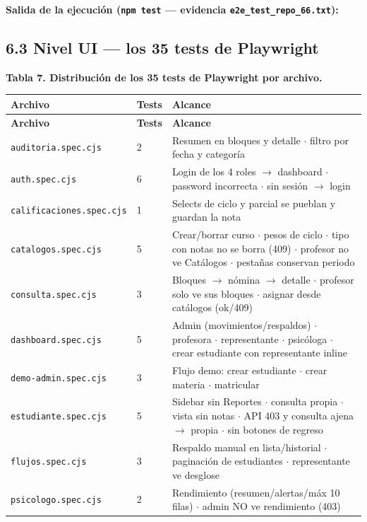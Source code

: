 \documentclass[11pt,a4paper]{article}
\begin{document}
\textbf{Salida de la ejecución (\texttt{npm test} --- evidencia \texttt{e2e\_test\_repo\_66.txt}):}


\subsection*{6.3 Nivel UI --- los 35 tests de Playwright}


\textbf{Tabla 7. Distribución de los 35 tests de Playwright por archivo.}


{\small
\begin{longtable}{|p{}|p{}|p{}|}
\rowcolor{UTECblue}\color{white}\bfseries Archivo & \color{white}\bfseries Tests & \color{white}\bfseries Alcance \\ \hline
\endfirsthead
\rowcolor{UTECblue}\color{white}\bfseries Archivo & \color{white}\bfseries Tests & \color{white}\bfseries Alcance \\ \hline
\endhead
\texttt{auditoria.spec.cjs} & 2 & Resumen en bloques y detalle {$\cdot$} filtro por fecha y categoría \\ \hline
\texttt{auth.spec.cjs} & 6 & Login de los 4 roles {$\rightarrow$} dashboard {$\cdot$} password incorrecta {$\cdot$} sin sesión {$\rightarrow$} login \\ \hline
\texttt{calificaciones.spec.cjs} & 1 & Selects de ciclo y parcial se pueblan y guardan la nota \\ \hline
\texttt{catalogos.spec.cjs} & 5 & Crear/borrar curso {$\cdot$} pesos de ciclo {$\cdot$} tipo con notas no se borra (409) {$\cdot$} profesor no ve Catálogos {$\cdot$} pestañas conservan periodo \\ \hline
\texttt{consulta.spec.cjs} & 3 & Bloques {$\rightarrow$} nómina {$\rightarrow$} detalle {$\cdot$} profesor solo ve sus bloques {$\cdot$} asignar desde catálogos (ok/409) \\ \hline
\texttt{dashboard.spec.cjs} & 5 & Admin (movimientos/respaldos) {$\cdot$} profesora {$\cdot$} representante {$\cdot$} psicóloga {$\cdot$} crear estudiante con representante inline \\ \hline
\texttt{demo-admin.spec.cjs} & 3 & Flujo demo: crear estudiante {$\cdot$} crear materia {$\cdot$} matricular \\ \hline
\texttt{estudiante.spec.cjs} & 5 & Sidebar sin Reportes {$\cdot$} consulta propia {$\cdot$} vista sin notas {$\cdot$} API 403 y consulta ajena {$\rightarrow$} propia {$\cdot$} sin botones de regreso \\ \hline
\texttt{flujos.spec.cjs} & 3 & Respaldo manual en lista/historial {$\cdot$} paginación de estudiantes {$\cdot$} representante ve desglose \\ \hline
\texttt{psicologo.spec.cjs} & 2 & Rendimiento (resumen/alertas/máx 10 filas) {$\cdot$} admin NO ve rendimiento (403) \\ \hline
\end{longtable}}
\end{document}

